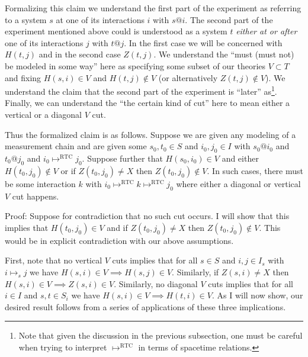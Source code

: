 \documentclass[12pt,prd,superscriptaddress,floatfix,amsmath,amssymb,amsfonts,nofootinbib]{revtex4-2}
\begin{document}
Formalizing this claim we understand the first part of the experiment as referring to a system $s$ at one of its interactions $i$ with $s@i$. The second part of the experiment mentioned above could is understood as a system $t$ \textit{either at or after} one of its interactions $j$ with $t@j$. In the first case we will be concerned with $H(t,j)$ and in the second case $Z(t,j)$. We understand the ``must (must not) be modeled in some way'' here as specifying some subset of our theories $V\subset T$ and fixing $H(s,i)\in V$ and $H(t,j)\notin V$ (or alternatively $Z(t,j)\notin V$). We understand the claim that the second part of the experiment is ``later'' as\footnote{Note that given the discussion in the previous subsection, one must be careful when trying to interpret $\mapsto^\text{RTC}$ in terms of spacetime relations.}. Finally, we can understand the ``the certain kind of cut'' here to mean either a vertical or a diagonal $V$ cut.%

Thus the formalized claim is as follows. Suppose we are given any modeling of a measurement chain and are given some $s_0,t_0\in S$ and $i_0,j_0\in I$ with $s_0@i_0$ and $t_0@j_0$ and \mbox{$i_0 \mapsto^\text{RTC}j_0$}. Suppose further that $H(s_0,i_0)\in V$ and either $H(t_0,j_0)\notin V$ or if \mbox{$Z(t_0,j_0)\neq X$} then \mbox{$Z(t_0,j_0)\notin V$}. In such cases, there must be some interaction $k$ with \mbox{$i_0\mapsto^\text{RTC} k \mapsto^\text{RTC} j_0$} where either a diagonal or vertical $V$ cut happens.

Proof: Suppose for contradiction that no such cut occurs. I will show that this implies that $H(t_0,j_0)\in V$ and if $Z(t_0,j_0)\neq X$ then $Z(t_0,j_0)\notin V$. This would be in explicit contradiction with our above assumptions.

First, note that no vertical $V$ cuts implies that for all $s\in S$ and $i,j\in I_s$ with $i\mapsto_s j$ we have \mbox{$H(s,i)\in V\implies H(s,j)\in V$}. Similarly, if $Z(s,i)\neq X$ then \mbox{$H(s,i)\in V\implies Z(s,i)\in V$}. Similarly, no diagonal $V$ cuts implies that for all $i\in I$ and $s,t\in S_i$ we have \mbox{$H(s,i)\in V\implies H(t,i)\in V$}. As I will now show, our desired result follows from a series of applications of these three implications.
\end{document}
